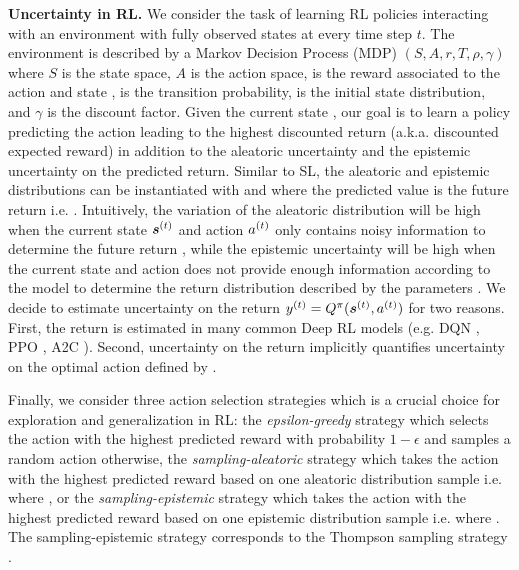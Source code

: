 \textbf{Uncertainty in RL.} We consider the task of learning RL policies interacting with an environment with fully observed states at every time step $t$. The environment is described by a Markov Decision Process (MDP) $(S, A, r, T, \rho, \gamma)$ where $S$ is the state space, $A$ is the action space,  is the reward associated to the action  and state \smash{$\s\datatx$},  is the transition probability,  is the initial state distribution, and $\gamma$ is the discount factor. Given the current state \smash{$\s\datatx$}, our goal is to learn a policy predicting the action  leading to the highest discounted return  (a.k.a. discounted expected reward) in addition to the aleatoric uncertainty  and the epistemic uncertainty  on the predicted return. Similar to SL, the aleatoric and epistemic distributions can be instantiated with \smash{$\prob(\y\datatx \mid \expparam\datatx)$} and \smash{$\prior(\expparam\datatx \mid \priorparam\datatx)$} where the predicted value is the future return i.e. . Intuitively, the variation of the aleatoric distribution will be high when the current state $\s\datatx$ and action $a^{(t)}$ only contains noisy information to determine the future return \smash{$\y\datatx$}, while the epistemic uncertainty will be high when the current state \smash{$\s\datatx$} and action  does not provide enough information according to the model to determine the return distribution \smash{$\prior(\expparam\datatx \mid \priorparam\datatx)$} described by the parameters \smash{$\priorparam\datatx$}.  We decide to estimate uncertainty on the return $y^{(t)}=Q^{\operatorname{\pi}}(\bm{s}^{(t)}, a^{(t)})$ for two reasons. First, the return is estimated in many common Deep RL models (e.g. DQN \cite{dqn}, PPO \cite{ppo}, A2C \cite{a2c}). Second, uncertainty on the return implicitly quantifies uncertainty on the optimal action defined by . 

Finally, we consider three action selection strategies which is a crucial choice for exploration and generalization in RL: the \emph{epsilon-greedy} strategy \cite{epsilon-greedy} which selects the action with the highest predicted reward with probability $1-\epsilon$ and samples a random action otherwise, the \emph{sampling-aleatoric} strategy which takes the action with the highest predicted reward based on one aleatoric distribution sample i.e.  where \smash{$\y\datatx \sim \prob(\y\datatx | \expparam\datatx)$}, or the \emph{sampling-epistemic} strategy which takes the action with the highest predicted reward based on one epistemic distribution sample i.e.  where \smash{$\expparam\datatx \sim \prior(\expparam\datatx | \priorparam\datatx)$}. The sampling-epistemic strategy corresponds to the Thompson sampling strategy \cite{thompson-sampling}.
